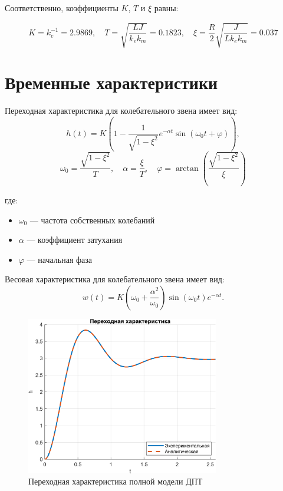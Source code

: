 Соответственно, коэффициенты $K$, $T$ и \( \xi \) равны:

\[
    K = k_e^{-1} = 2.9869, \quad T = \sqrt{\frac{LJ}{k_e k_m}} = 0.1823, \quad \xi = \frac{R}{2} \sqrt{\frac{J}{Lk_e k_m}} = 0.037
\]

\section{Временные характеристики}

Переходная характеристика для колебательного звена имеет вид:
\[
h(t) = K \left( 1 - \frac{1}{\sqrt{1 - \xi^2}} e^{-\alpha t} \sin(\omega_0 t + \varphi) \right),
\]
\[
\omega_0 = \frac{\sqrt{1 - \xi^2}}{T}, \quad \alpha = \frac{\xi}{T}, \quad \varphi = \arctan\left(\frac{\sqrt{1 - \xi^2}}{\xi}\right)
\]

где:
\begin{itemize}
    \item[] \( \omega_0 \) — частота собственных колебаний
    \item[] \( \alpha \) — коэффициент затухания
    \item[] \( \varphi \) — начальная фаза
\end{itemize}

Весовая характеристика для колебательного звена имеет вид:
\[
    w(t) = K \left(\omega_0 + \frac{\alpha^2}{\omega_0}\right) \sin(\omega_0 t) e^{-\alpha t}.
\]

\begin{figure}[H]
    \centering
    \includegraphics[width=0.75\textwidth, trim={0cm 0cm 0cm 0cm}]{../images/2_1.png}
    \caption{Переходная характеристика полной модели ДПТ} 
\end{figure}

